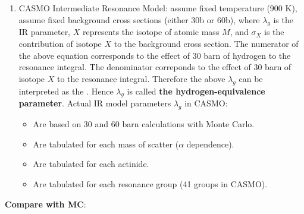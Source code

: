 \documentclass{school-22.211-notes}
\begin{document}
\begin{enumerate}
\item CASMO Intermediate Resonance Model: assume fixed temperature (900 K), assume fixed background cross sections (either 30b or 60b), 
where $\lambda_g$ is the IR parameter, $X$ represents the isotope of atomic mass $M$, and $\sigma_X$ is the contribution of isotope $X$ to the background cross section. The numerator of the above equation corresponds to the effect of 30 barn of hydrogen to the resonance integral. The denominator correponds to the effect of 30 barn of isotope $X$ to the resonance integral. Therefore the above $\lambda_g$ can be interpreted as the . Hence $\lambda_g$ is called \textbf{the hydrogen-equivalence parameter}. Actual IR model parameters $\lambda_g$ in CASMO: 
\begin{itemize}
\item Are based on 30 and 60 barn calculations with Monte Carlo. 
\item Are tabulated for each mass of scatter ($\alpha$ dependence). 
\item Are tabulated for each actinide. 
\item Are tabulated for each resonance group (41 groups in CASMO). 
\end{itemize}
\end{enumerate}
\textbf{Compare with MC}\label{narrow-wide-compr}: 
\end{document}
